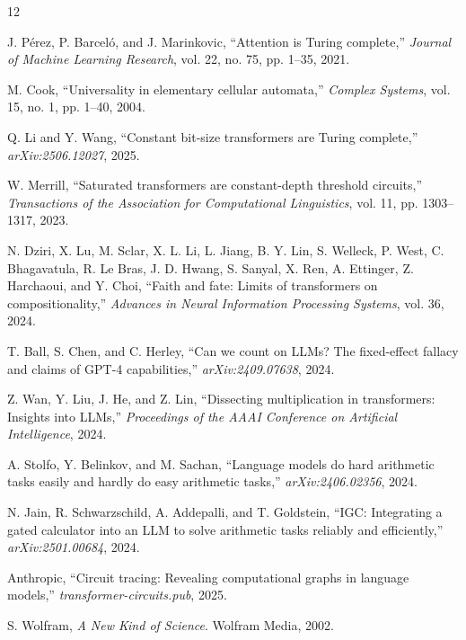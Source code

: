 \documentclass[twocolumn,switch,10pt]{article}
\begin{document}
\begin{thebibliography}{12}

J. Pérez, P. Barceló, and J. Marinkovic, ``Attention is Turing complete,'' \emph{Journal of Machine Learning Research}, vol. 22, no. 75, pp. 1--35, 2021.

M. Cook, ``Universality in elementary cellular automata,'' \emph{Complex Systems}, vol. 15, no. 1, pp. 1--40, 2004.

Q. Li and Y. Wang, ``Constant bit-size transformers are Turing complete,'' \emph{arXiv:2506.12027}, 2025.

W. Merrill, ``Saturated transformers are constant-depth threshold circuits,'' \emph{Transactions of the Association for Computational Linguistics}, vol. 11, pp. 1303--1317, 2023.

N. Dziri, X. Lu, M. Sclar, X. L. Li, L. Jiang, B. Y. Lin, S. Welleck, P. West, C. Bhagavatula, R. Le Bras, J. D. Hwang, S. Sanyal, X. Ren, A. Ettinger, Z. Harchaoui, and Y. Choi, ``Faith and fate: Limits of transformers on compositionality,'' \emph{Advances in Neural Information Processing Systems}, vol. 36, 2024.

T. Ball, S. Chen, and C. Herley, ``Can we count on LLMs? The fixed-effect fallacy and claims of GPT-4 capabilities,'' \emph{arXiv:2409.07638}, 2024.

Z. Wan, Y. Liu, J. He, and Z. Lin, ``Dissecting multiplication in transformers: Insights into LLMs,'' \emph{Proceedings of the AAAI Conference on Artificial Intelligence}, 2024.

A. Stolfo, Y. Belinkov, and M. Sachan, ``Language models do hard arithmetic tasks easily and hardly do easy arithmetic tasks,'' \emph{arXiv:2406.02356}, 2024.

N. Jain, R. Schwarzschild, A. Addepalli, and T. Goldstein, ``IGC: Integrating a gated calculator into an LLM to solve arithmetic tasks reliably and efficiently,'' \emph{arXiv:2501.00684}, 2024.

Anthropic, ``Circuit tracing: Revealing computational graphs in language models,'' \emph{transformer-circuits.pub}, 2025.

S. Wolfram, \emph{A New Kind of Science}. Wolfram Media, 2002.

\end{thebibliography}
\end{document}
